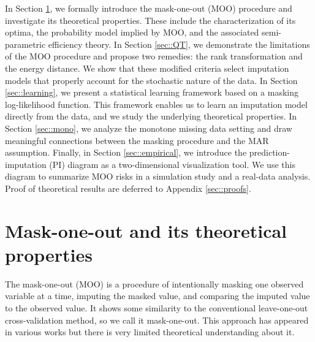 \documentclass[aos, preprint]{imsart}
\theoremstyle{plain}
\theoremstyle{definition}
\begin{document}
In Section \ref{sec::MOO}, we formally introduce the mask-one-out (MOO) procedure and investigate its theoretical properties. These include the characterization of its optima, the probability model implied by MOO, and the associated semi-parametric efficiency theory.
In Section \ref{sec::QT}, we demonstrate the limitations of the MOO procedure and propose two remedies: the rank transformation and the energy distance. We show that these modified criteria select imputation models that properly account for the stochastic nature of the data.
In Section \ref{sec::learning}, we present a statistical learning framework based on a masking log-likelihood function. This framework enables us to learn an imputation model directly from the data, and we study the underlying theoretical properties.
In Section \ref{sec::mono}, we analyze the monotone missing data setting and draw meaningful connections between the masking procedure and the MAR assumption.
Finally, in Section \ref{sec::empirical}, we introduce the prediction-imputation (PI) diagram as a two-dimensional visualization tool. We use this diagram to summarize MOO risks in a simulation study and a real-data analysis.
Proof of theoretical results are deferred to Appendix \ref{sec::proofs}.

\section{Mask-one-out and its theoretical properties}	\label{sec::MOO}




The mask-one-out (MOO) is a procedure of intentionally masking one observed variable
at a time,  imputing the masked value, and  comparing the imputed value to the observed value. 
It shows some similarity to the conventional leave-one-out cross-validation method, so we call it mask-one-out. 
This approach has appeared in various works \citep{gelman1998not,troyanskaya2001missing,honaker2011amelia, leek2012sva,qian2024unveiling,wang2024deep}
but there is very limited theoretical understanding about it.
\end{document}
